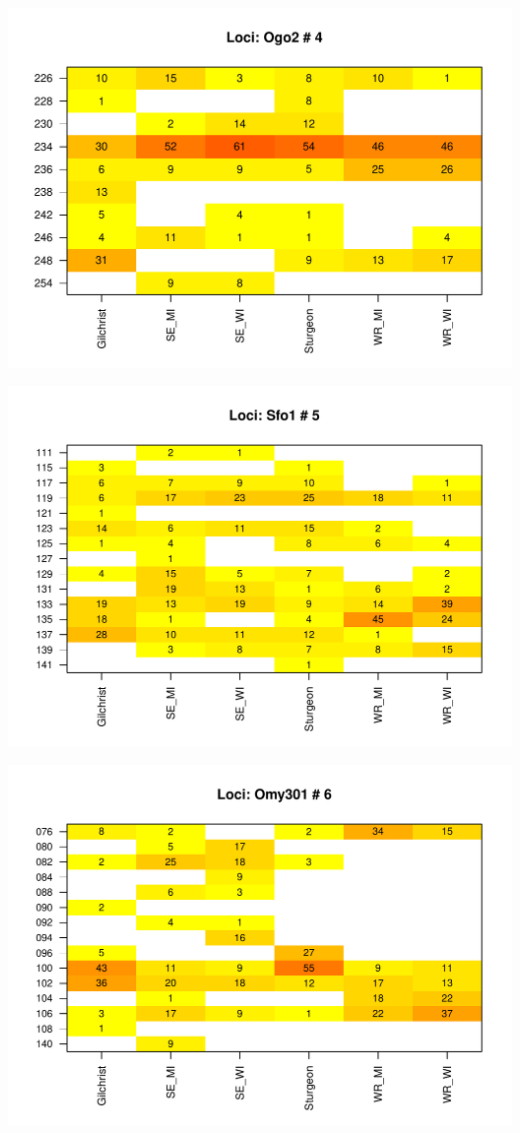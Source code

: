 \documentclass[a4paper]{scrartcl}\usepackage[]{graphicx}\usepackage[]{color}
\makeatletter
\def\maxwidth{ %
  \ifdim\Gin@nat@width>\linewidth
    \linewidth
  \else
    \Gin@nat@width
  \fi
}
\newenvironment{knitrout}{}{} %
\makeatother
\begin{document}
\begin{knitrout}
\includegraphics[width=\maxwidth]{PopGenReport_Hatchery-heatmap-4} 

\includegraphics[width=\maxwidth]{PopGenReport_Hatchery-heatmap-5} 

\includegraphics[width=\maxwidth]{PopGenReport_Hatchery-heatmap-6} 


\end{knitrout}
\end{document}
